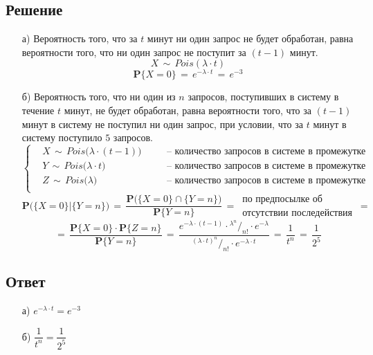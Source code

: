 \documentclass{article}
\newcommand*\rfrac[2]{{}^{#1}\!/_{#2}}
\begin{document}
\subsection*{Решение}
\begin{itemize}
\item[а)] Вероятность того, что за $ t $ минут ни один запрос не будет обработан, равна вероятности того, что ни один запрос не поступит за $ (t \! - \! 1) $ минут.
\[ X \, \sim \, Pois(\lambda \! \cdot \! t) \]
\[ \mathbf{P} \big\{ X \! = \! 0 \big\} \, = \, e^{-\lambda \cdot t} \, = \, e^{-3} \]
\item[б)] Вероятность того, что ни один из $ n $ запросов, поступивших в систему в течение $ t $ минут, не будет обработан, равна вероятности того, что за $ (t \! - \! 1) $ минут в систему не поступил ни один запрос, при условии, что за $ t $ минут в систему поступило $ 5 $ запросов.
\begin{equation*}
\left\{
\begin{aligned}
& X \, \sim \, Pois \big( \lambda \! \cdot \! (t \! - \! 1) \big) & & \quad \text{-- количество запросов в системе в промежутке [0;t-1]} \\
& Y \, \sim \, Pois \big( \lambda \! \cdot \! t \big) & & \quad \text{-- количество запросов в системе в промежутке [0;t]} \\
& Z \, \sim \, Pois \big( \lambda \big) & & \quad \text{-- количество запросов в системе в промежутке [t-1;t]} \\
\end{aligned}
\right.
\end{equation*}
\[ \mathbf{P} \bigg( \big\{ X \! = \! 0 \big\} \big| \big\{ Y \! = \! n \big\} \bigg) \, = \, \dfrac{\mathbf{P} \bigg( \big\{ X \! = \! 0 \big\} \cap \big\{ Y \! = \! n \big\} \bigg)}{\mathbf{P} \big\{ Y \! = \! n \big\}} \, = \, 
\begin{matrix}
\text{по предпосылке об} \\
\text{отсутствии последействия}
\end{matrix} \, = \]
\[ = \, \dfrac{\mathbf{P} \big\{ X \! = \! 0 \big\} \! \cdot \! \mathbf{P} \big\{ Z \! = \! n \big\}}{\mathbf{P} \big\{ Y \! = \! n \big\}} \, = \, \dfrac{e^{-\lambda \cdot (t-1)}  \cdot \rfrac{\lambda^n}{n!} \cdot \! e^{-\lambda}}{\rfrac{{(\lambda \cdot t)}^n}{n!} \cdot \! e^{-\lambda \cdot t}} \, = \, \dfrac{1}{t^n} \, = \, \dfrac{1}{2^5} \] 
\end{itemize}
\subsection*{Ответ}
\begin{enumerate}
\item[а)] $ e^{-\lambda \cdot t} \! = \! e^{-3} $
\item[б)] $ \dfrac{1}{t^n} \! = \! \dfrac{1}{2^5} $
\end{enumerate}
\end{document}
